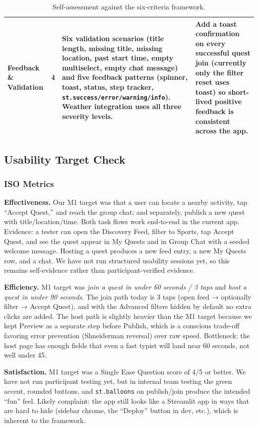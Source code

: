 \documentclass[11pt]{article}
\begin{document}
\begin{table}[h!]
\begin{tabularx}{\textwidth}{>{\bfseries}l c X X}
\addlinespace
Feedback \& Validation & 4 & Six validation scenarios (title length, missing title, missing location, past start time, empty multiselect, empty chat message) and five feedback patterns (spinner, toast, status, step tracker, \texttt{st.success/error/warning/info}). Weather integration uses all three severity levels. & Add a toast confirmation on every successful quest join (currently only the filter reset uses toast) so short-lived positive feedback is consistent across the app. \\
\bottomrule
\end{tabularx}
\caption{Self-assessment against the six-criteria framework.}
\end{table}

\subsection{Usability Target Check}

\subsubsection{ISO Metrics}

\textbf{Effectiveness.} Our M1 target was that a user can locate a nearby activity, tap ``Accept Quest,'' and reach the group chat; and separately, publish a new quest with title/location/time. Both task flows work end-to-end in the current app. Evidence: a tester can open the Discovery Feed, filter to Sports, tap Accept Quest, and see the quest appear in My Quests and in Group Chat with a seeded welcome message. Hosting a quest produces a new feed entry, a new My Quests row, and a chat. We have not run structured usability sessions yet, so this remains self-evidence rather than participant-verified evidence.

\textbf{Efficiency.} M1 target was \textit{join a quest in under 60 seconds / 3 taps} and \textit{host a quest in under 90 seconds}. The join path today is 3 taps (open feed → optionally filter → Accept Quest), and with the Advanced filters hidden by default no extra clicks are added. The host path is slightly heavier than the M1 target because we kept Preview as a separate step before Publish, which is a conscious trade-off favoring error prevention (Shneiderman reversal) over raw speed. Bottleneck: the host page has enough fields that even a fast typist will land near 60 seconds, not well under 45.

\textbf{Satisfaction.} M1 target was a Single Ease Question score of 4/5 or better. We have not run participant testing yet, but in internal team testing the green accent, rounded buttons, and \texttt{st.balloons} on publish/join produce the intended ``fun'' feel. Likely complaint: the app still looks like a Streamlit app in ways that are hard to hide (sidebar chrome, the ``Deploy'' button in dev, etc.), which is inherent to the framework.
\end{document}
